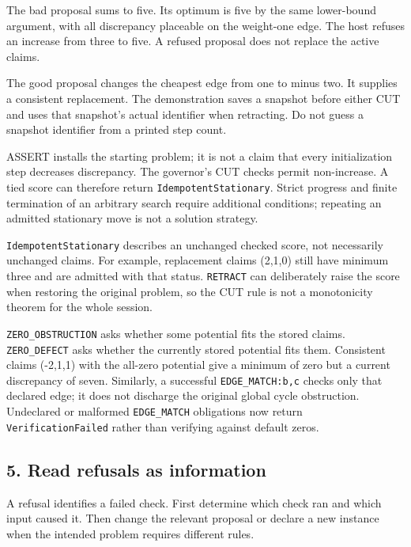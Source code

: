 \documentclass[
  11pt,
]{article}
\begin{document}
The bad proposal sums to five. Its optimum is five by the same
lower-bound argument, with all discrepancy placeable on the weight-one
edge. The host refuses an increase from three to five. A refused
proposal does not replace the active claims.

The good proposal changes the cheapest edge from one to minus two. It
supplies a consistent replacement. The demonstration saves a snapshot
before either CUT and uses that snapshot's actual identifier when
retracting. Do not guess a snapshot identifier from a printed step
count.

ASSERT installs the starting problem; it is not a claim that every
initialization step decreases discrepancy. The governor's CUT checks
permit non-increase. A tied score can therefore return
\texttt{IdempotentStationary}. Strict progress and finite termination of
an arbitrary search require additional conditions; repeating an admitted
stationary move is not a solution strategy.

\texttt{IdempotentStationary} describes an unchanged checked score, not
necessarily unchanged claims. For example, replacement claims (2,1,0)
still have minimum three and are admitted with that status.
\texttt{RETRACT} can deliberately raise the score when restoring the
original problem, so the CUT rule is not a monotonicity theorem for the
whole session.

\texttt{ZERO\_OBSTRUCTION} asks whether some potential fits the stored
claims. \texttt{ZERO\_DEFECT} asks whether the currently stored
potential fits them. Consistent claims (-2,1,1) with the all-zero
potential give a minimum of zero but a current discrepancy of seven.
Similarly, a successful \texttt{EDGE\_MATCH:b,c} checks only that
declared edge; it does not discharge the original global cycle
obstruction. Undeclared or malformed \texttt{EDGE\_MATCH} obligations
now return \texttt{VerificationFailed} rather than verifying against
default zeros.

\hypertarget{read-refusals-as-information}{%
\subsection{5. Read refusals as
information}\label{read-refusals-as-information}}

A refusal identifies a failed check. First determine which check ran and
which input caused it. Then change the relevant proposal or declare a
new instance when the intended problem requires different rules.
\end{document}
